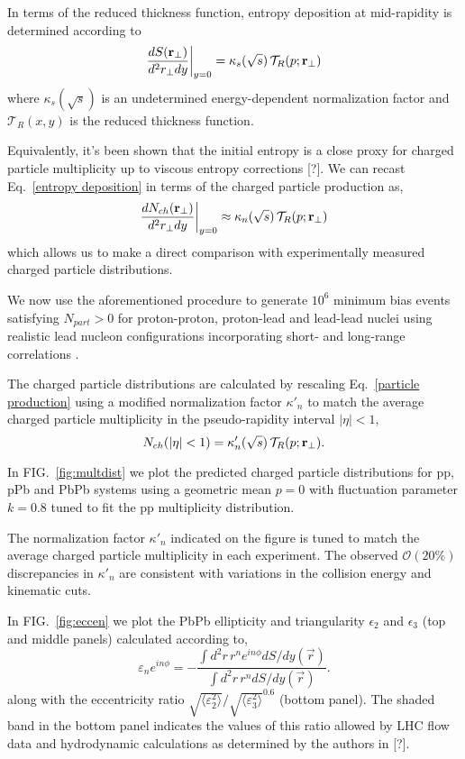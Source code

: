 \documentclass[aps,prl,reprint,amsmath,nofootinbib]{revtex4-1}
\begin{document}
In terms of the reduced
thickness function, entropy deposition at mid-rapidity is determined according to
\begin{equation}
  \label{entropy deposition}
  \frac{dS({\bf r}_\perp)}{d^2r_\perp dy} \biggr \rvert_{y=0} = \kappa_s(\sqrt{s})\, \mathcal{T}_R(p;{\bf r}_\perp)
\end{equation}
where $\kappa_s(\sqrt{s})$ is an undetermined energy-dependent normalization factor and $\mathcal{T}_R(x,y)$
is the reduced thickness function.

Equivalently, it's been shown that the initial entropy is a close proxy for charged particle multiplicity up
to viscous entropy corrections [?]. We can recast Eq.~\eqref{entropy deposition} in terms of the charged
particle production as,
\begin{equation}
  \label{particle production}
  \frac{dN_{ch}({\bf r}_\perp)}{d^2r_\perp dy} \biggr \rvert_{y=0} \approx
  \kappa_n(\sqrt{s})\, \mathcal{T}_R(p;{\bf r}_\perp)
\end{equation}
which allows us to make a direct comparison with experimentally measured charged particle distributions.

We now use the aforementioned procedure to generate $10^6$ minimum bias events satisfying $N_{part} > 0$ for
proton-proton, proton-lead and lead-lead nuclei using realistic lead nucleon configurations incorporating
short- and long-range correlations \cite{nucleon-correlations}.

The charged particle distributions are calculated by rescaling Eq.~\eqref{particle production} using a
modified normalization factor $\kappa'_n$ to match the average charged particle multiplicity in the
pseudo-rapidity interval $|\eta| < 1$,
\begin{equation}
  N_{ch}(|\eta|<1) = \kappa'_n(\sqrt{s})\, \mathcal{T}_R(p;{\bf r}_\perp).
\end{equation}

In FIG.~\ref{fig:multdist} we plot the predicted charged particle distributions for pp, pPb and PbPb systems
using a geometric mean $p=0$ with fluctuation parameter $k=0.8$ tuned to fit the pp multiplicity
distribution.

The normalization factor $\kappa'_n$ indicated on the figure is tuned to match the average charged particle
multiplicity in each experiment. The observed $\mathcal{O}(20\%)$ discrepancies in $\kappa'_n$ are consistent
with variations in the collision energy and kinematic cuts.

In FIG.~\ref{fig:eccen} we plot the PbPb ellipticity and triangularity $\epsilon_2$ and $\epsilon_3$ (top
and middle panels) calculated according to,
\begin{equation}
  \varepsilon_n e^{i n\phi} = -\frac{\int d^2r\, r^n e^{i n \phi} dS/dy(\vec{r})}{\int d^2r\, r^n dS/dy(\vec{r})}.
\end{equation}
along with the eccentricity ratio $\sqrt{\langle \varepsilon_2^2 \rangle}/\sqrt{\langle \varepsilon_3^2
\rangle}^{0.6}$ (bottom panel). The shaded band in the bottom panel indicates the values of this ratio allowed
by LHC flow data and hydrodynamic calculations as determined by the authors in [?].
\end{document}

